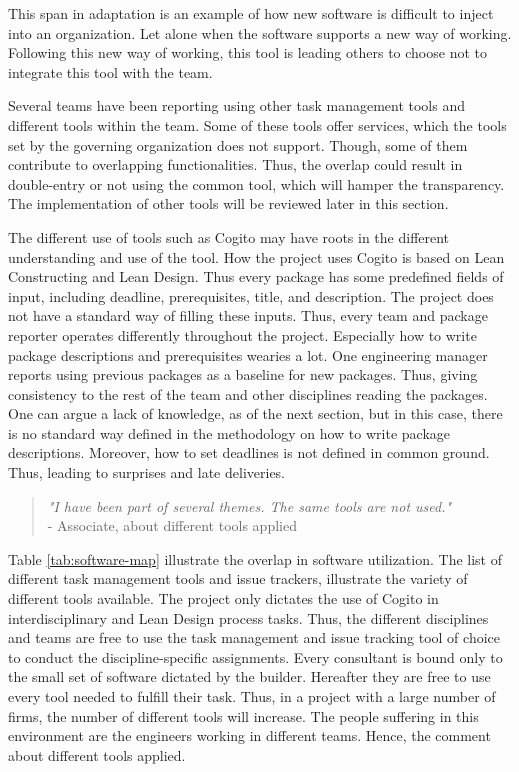 This span in adaptation is an example of how new software is difficult to inject into an organization. Let alone when the software supports a new way of working. Following this new way of working, this tool is leading others to choose not to integrate this tool with the team.

Several teams have been reporting using other task management tools and different tools within the team. Some of these tools offer services, which the tools set by the governing organization does not support. Though, some of them contribute to overlapping functionalities. Thus, the overlap could result in double-entry or not using the common tool, which will hamper the transparency. The implementation of other tools will be reviewed later in this section. 

The different use of tools such as Cogito may have roots in the different understanding and use of the tool. How the project uses Cogito is based on Lean Constructing and Lean Design. Thus every package has some predefined fields of input, including deadline, prerequisites, title, and description. The project does not have a standard way of filling these inputs. Thus, every team and package reporter operates differently throughout the project. Especially how to write package descriptions and prerequisites wearies a lot. 
One engineering manager reports using previous packages as a baseline for new packages. Thus, giving consistency to the rest of the team and other disciplines reading the packages. One can argue a lack of knowledge, as of the next section, but in this case, there is no standard way defined in the methodology on how to write package descriptions. Moreover, how to set deadlines is not defined in common ground. Thus, leading to surprises and late deliveries. 

\begin{quote}
    \textit{"I have been part of several themes. The same tools are not used."}
    \\ - Associate, about different tools applied
\end{quote}

Table \ref{tab:software-map} illustrate the overlap in software utilization. The list of different task management tools and issue trackers, illustrate the variety of different tools available. The project only dictates the use of Cogito in interdisciplinary and Lean Design process tasks. Thus, the different disciplines and teams are free to use the task management and issue tracking tool of choice to conduct the discipline-specific assignments. Every consultant is bound only to the small set of software dictated by the builder. Hereafter they are free to use every tool needed to fulfill their task. Thus, in a project with a large number of firms, the number of different tools will increase. The people suffering in this environment are the engineers working in different teams. Hence, the comment about different tools applied. 

